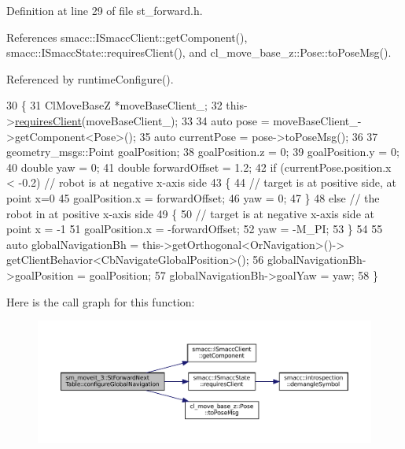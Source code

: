 Definition at line 29 of file st\+\_\+forward.\+h.



References smacc\+::\+I\+Smacc\+Client\+::get\+Component(), smacc\+::\+I\+Smacc\+State\+::requires\+Client(), and cl\+\_\+move\+\_\+base\+\_\+z\+::\+Pose\+::to\+Pose\+Msg().



Referenced by runtime\+Configure().


\begin{DoxyCode}
30   \{
31     ClMoveBaseZ *moveBaseClient\_;
32     this->\hyperlink{classsmacc_1_1ISmaccState_a7f95c9f0a6ea2d6f18d1aec0519de4ac}{requiresClient}(moveBaseClient\_);
33 
34     \textcolor{keyword}{auto} pose = moveBaseClient\_->getComponent<Pose>();
35     \textcolor{keyword}{auto} currentPose = pose->toPoseMsg();
36 
37     geometry\_msgs::Point goalPosition;
38     goalPosition.z = 0;
39     goalPosition.y = 0;
40     \textcolor{keywordtype}{double} yaw = 0;
41     \textcolor{keywordtype}{double} forwardOffset = 1.2;
42     \textcolor{keywordflow}{if} (currentPose.position.x < -0.2)  \textcolor{comment}{// robot is at negative x-axis side}
43     \{
44       \textcolor{comment}{// target is at positive side, at point x=0}
45       goalPosition.x = forwardOffset;
46       yaw = 0;
47     \}
48     \textcolor{keywordflow}{else}  \textcolor{comment}{// the robot in at positive x-axis side}
49     \{
50       \textcolor{comment}{// target is at negative x-axis side at point x = -1}
51       goalPosition.x = -forwardOffset;
52       yaw = -M\_PI;
53     \}
54 
55     \textcolor{keyword}{auto} globalNavigationBh = this->getOrthogonal<OrNavigation>()->
      getClientBehavior<CbNavigateGlobalPosition>();
56     globalNavigationBh->goalPosition = goalPosition;
57     globalNavigationBh->goalYaw = yaw;
58   \}
\end{DoxyCode}
Here is the call graph for this function\+:
\nopagebreak
\begin{figure}[H]
\begin{center}
\leavevmode
\includegraphics[width=350pt]{structsm__moveit__3_1_1StForwardNextTable_a0027b604f471fad11d66c027a3ef662a_cgraph}
\end{center}
\end{figure}
